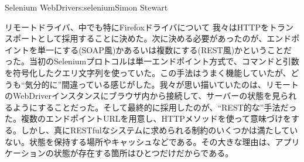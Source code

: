\begin{aosachapter}{Selenium WebDriver}{s:selenium}{Simon Stewart}
\begin{aosasect1}{リモートドライバ、中でも特にFirefoxドライバについて}
我々はHTTPをトランスポートとして採用することに決めた。次に決める必要があったのが、エンドポイントを単一にする(SOAP風)かあるいは複数にする(REST風)かということだった。当初のSeleniumプロトコルは単一エンドポイント方式で、コマンドと引数を符号化したクエリ文字列を使っていた。この手法はうまく機能していたが、どうも``気分的に''間違っている感じがした。我々が思い描いていたのは、リモートのWebDriverインスタンスにブラウザ内から接続して、サーバーの状態を見られるようにすることだった。そして最終的に採用したのが、``REST的な''手法だった。複数のエンドポイントURLを用意し、HTTPメソッドを使って意味づけをする。しかし、真にRESTfulなシステムに求められる制約のいくつかは満たしていない。状態を保持する場所やキャッシュなどである。その大きな理由は、アプリケーションの状態が存在する箇所はひとつだけだからである。


\end{aosasect1}
\end{aosachapter}
